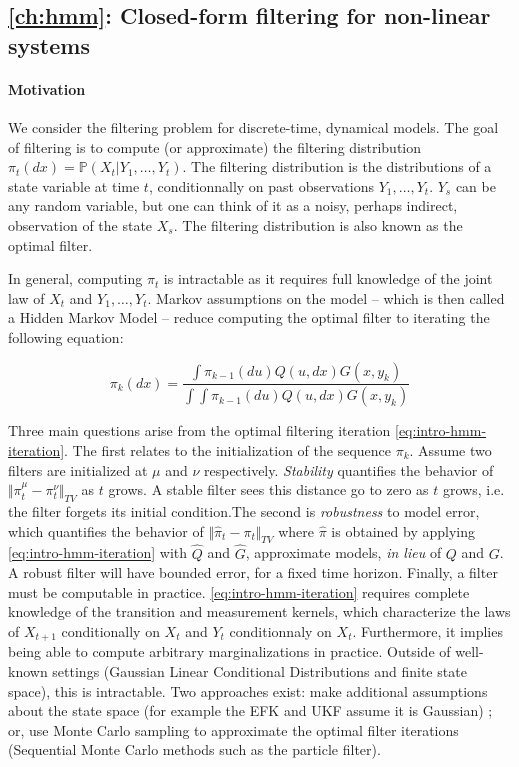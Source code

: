 \subsection*{\cref{ch:hmm}: Closed-form filtering for non-linear systems}

\paragraph{Motivation}
We consider the filtering problem for discrete-time, dynamical models. The goal of filtering is to compute (or approximate) the filtering distribution $\pi_t(dx) = \mathbb P(X_t\vert Y_1, \ldots, Y_{t})$. The filtering distribution is the distributions of a state variable at time $t$, conditionnally on past observations $Y_1, \ldots, Y_t$. $Y_s$ can be any random variable, but one can think of it as a noisy, perhaps indirect, observation of the state $X_s$. The filtering distribution is also known as the optimal filter.

In general, computing $\pi_t$ is intractable as it requires full knowledge of the joint law of $X_t$  and $Y_1, \ldots, Y_t$. Markov assumptions on the model -- which is then called a Hidden Markov Model -- reduce computing the optimal filter to iterating the following equation:

\begin{equation}\label{eq:intro-hmm-iteration}
\pi_k(dx) = \frac{\int \pi_{k-1}(du)Q(u, dx)G(x, y_k)}{\int \int \pi_{k-1}(du)Q(u, dx)G(x, y_k)}
\end{equation}

Three main questions arise from the optimal filtering iteration \cref{eq:intro-hmm-iteration}. The first relates to the initialization of the sequence $\pi_k$. Assume two filters are initialized at $\mu$ and $\nu$ respectively. \emph{Stability} quantifies the behavior of $\Vert \pi_t^\mu - \pi_t^\nu \Vert_{TV}$ as $t$ grows. A stable filter sees this distance go to zero as $t$ grows, i.e. the filter forgets its initial condition.The second is \emph{robustness} to model error, which quantifies the behavior of $\Vert \hat\pi_t - \pi_t\Vert_{TV}$ where $\hat \pi$ is obtained by applying \cref{eq:intro-hmm-iteration} with $\hat Q$ and $\hat G$, approximate models, \emph{in lieu} of $Q$ and $G$. A robust filter will have bounded error, for a fixed time horizon. Finally, a filter must be computable in practice. \cref{eq:intro-hmm-iteration} requires complete knowledge of the transition and measurement kernels, which characterize the laws of $X_{t+1}$ conditionally on $X_t$ and $Y_t$ conditionnaly on $X_t$. Furthermore, it implies being able to compute arbitrary marginalizations in practice. Outside of well-known settings (Gaussian Linear Conditional Distributions and finite state space), this is intractable. Two approaches exist: make additional assumptions about the state space (for example the EFK and UKF assume it is Gaussian) ; or, use Monte Carlo sampling to approximate the optimal filter iterations (Sequential Monte Carlo methods such as the particle filter).

